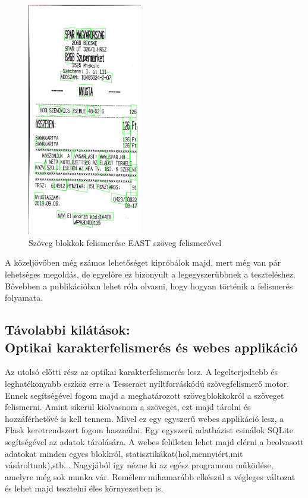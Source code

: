 \documentclass[a4paper,12pt]{article}
\begin{document}
\newpage
\begin{figure}[h]
	\centering
	\includegraphics[width=5cm]{out}
	\caption{Szöveg blokkok felismerése EAST szöveg felismerővel \cite{east2}}
\end{figure}

A közeljövőben még számos lehetőséget kipróbálok majd, mert még van pár lehetséges megoldás, de egyelőre ez bizonyult a legegyszerűbbnek a teszteléshez. Bővebben a publikációban lehet róla olvasni, hogy hogyan történik a felismerés folyamata. 

\subsection{Távolabbi kilátások: \\Optikai karakterfelismerés és webes applikáció}
Az utolsó előtti rész az optikai karakterfelismerés lesz. A legelterjedtebb és leghatékonyabb eszköz erre a Tesseract nyíltforráskódú szövegfelismerő motor. Ennek segítségével fogom majd a meghatározott szövegblokkokról a szöveget felismerni. 
Amint sikerül kiolvasnom a szöveget, ezt majd tárolni és hozzáférhetővé is kell tennem. Mivel ez egy egyszerű webes applikáció lesz, a Flask keretrendszert fogom használni. Egy egyszerű adatbázist csinálok SQLite segítségével az adatok tárolására. A webes felületen lehet majd elérni a beolvasott adatokat minden egyes blokkról, statisztikákat(hol,mennyiért,mit vásároltunk),stb...
Nagyjából így nézne ki az egész programom működése, amelyre még sok munka vár. Remélem mihamarább elkészül a végleges változat és lehet majd tesztelni éles környezetben is. \
\newpage
\end{document}
